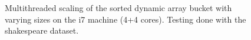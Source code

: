 \begin{landscape}
\begin{figure}[!h]
{        }
        \label{fig:ts_i7_shake_sorted}
        \caption{Multithreaded scaling of the sorted dynamic array bucket with varying sizes on the
        i7 machine (4+4 cores). Testing done with the shakespeare dataset.}
    \end{figure}
    \begin{figure}[!h]
\end{figure}
\end{landscape}
